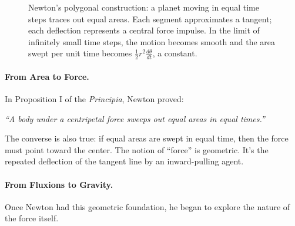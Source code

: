 \begin{figure}[H]
\centering
{}
\caption{Newton’s polygonal construction: a planet moving in equal time steps traces out equal areas. Each segment approximates a tangent; each deflection represents a central force impulse. In the limit of infinitely small time steps, the motion becomes smooth and the area swept per unit time becomes \( \frac{1}{2} r^2 \frac{d\theta}{dt} \), a constant.}
\end{figure}

\paragraph{From Area to Force.} In Proposition I of the \textit{Principia}, Newton proved:  

\textit{“A body under a centripetal force sweeps out equal areas in equal times.”}

The converse is also true: if equal areas are swept in equal time, then the force must point toward the center. The notion of “force” is geometric. It’s the repeated deflection of the tangent line by an inward-pulling agent.

\paragraph{From Fluxions to Gravity.} Once Newton had this geometric foundation, he began to explore the nature of the force itself.

